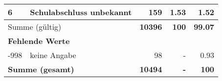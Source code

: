 \begin{longtable}{lXrrr}
     6 &
     \multicolumn{1}{X}{ Schulabschluss unbekannt   } &


       \num{159} &
       \num[round-mode=places,round-precision=2]{1,53} &
         \num[round-mode=places,round-precision=2]{1,52} \\
     \midrule
     \multicolumn{2}{l}{Summe (gültig)} &
       \textbf{\num{10396}} &
     \textbf{100} &
       \textbf{\num[round-mode=places,round-precision=2]{99,07}} \\
     \multicolumn{5}{l}{\textbf{Fehlende Werte}}\\
       -998 &
       keine Angabe &
         \num{98} &
        - &
         \num[round-mode=places,round-precision=2]{0,93} \\
     \midrule
     \multicolumn{2}{l}{\textbf{Summe (gesamt)}} &
          \textbf{\num{10494}} &
        \textbf{-} &
        \textbf{100} \\
     \bottomrule
     \end{longtable}
     
